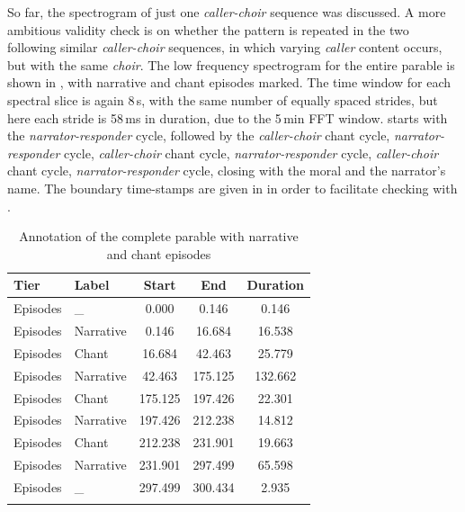 \documentclass[output=paper,colorlinks,citecolor=brown]{langscibook}
\begin{document}
So far, the spectrogram of just one \textit{caller-choir} sequence was discussed. A more ambitious validity check is on whether the pattern is repeated in the two following similar \textit{caller-choir} sequences, in which varying \textit{caller} content occurs, but with the same \textit{choir}. The low frequency spectrogram for the entire parable is shown in , with narrative and chant episodes marked. The time window for each spectral slice is again 8\,s, with the same number of equally spaced strides, but here each stride is 58\,ms in duration, due to the 5\,min FFT window.  starts with the \textit{narrator-responder} cycle, followed by the \textit{caller-choir} chant cycle, \textit{narrator-responder} cycle, \textit{caller-choir} chant cycle, \textit{narrator-responder} cycle, \textit{caller-choir} chant cycle, \textit{narrator-responder} cycle, closing with the moral and the narrator's name. The boundary time-stamps are given in  in order to facilitate checking with .

\begin{table}
\caption{Annotation of the complete parable with narrative and chant episodes}
\label{table:table02}
\begin{tabular}{ll *3{S[table-format=3.3]}}
\lsptoprule
Tier        & Label         & {Start} & {End} & {Duration}\\\midrule
Episodes	&	\_	        &	0.000	&	0.146	&	0.146\\
Episodes	&	Narrative	&	0.146	&	16.684	&	16.538\\
Episodes	&	Chant	&	16.684	&	42.463	&	25.779\\
Episodes	&	Narrative	&	42.463	&	175.125	&	132.662\\
Episodes	&	Chant	&	175.125	&	197.426	&	22.301\\
Episodes	&	Narrative	&	197.426	&	212.238	&	14.812\\
Episodes	&	Chant	&	212.238	&	231.901	&	19.663\\
Episodes	&	Narrative	&	231.901	&	297.499	&	65.598\\
Episodes	&	\_	&	297.499	&	300.434	&	2.935\\
\lspbottomrule
\end{tabular}
\end{table}
\end{document}
